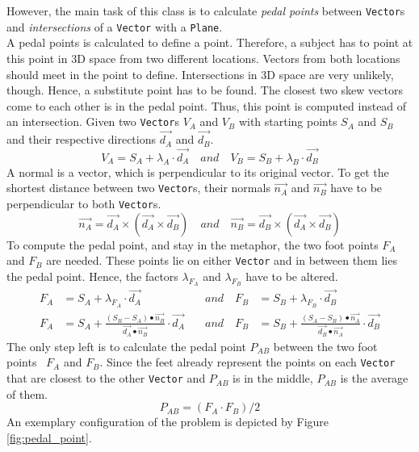 However, the main task of this class is to calculate \textit{pedal points} between \texttt{Vector}s and \textit{intersections} of a \texttt{Vector} with a \texttt{Plane}. 
\\
A pedal points is calculated to define a point. Therefore, a subject has to point at this point in \ac{3D} space from two different locations. Vectors  from both locations should meet in the point to define. Intersections in \ac{3D} space are very unlikely, though. Hence, a substitute point has to be found. The closest two skew vectors come to each other is in the pedal point. Thus, this point is computed instead of an intersection. Given two \texttt{Vector}s $V_{A}$ and $V_{B}$ with starting points $S_{A}$ and $S_{B}$ and their respective directions $\overrightarrow{d_{A}}$ and $\overrightarrow{d_{B}}$.
$$V_{A} = S_{A} + \lambda_{A} \cdot \overrightarrow{d_{A}} \quad and \quad V_{B} = S_{B} + \lambda_{B} \cdot \overrightarrow{d_{B}}$$
A normal is a vector, which is perpendicular to its original vector. To get the shortest distance between two \texttt{Vector}s, their normals $\overrightarrow{n_{A}}$ and $\overrightarrow{n_{B}}$ have to be perpendicular to both \texttt{Vector}s. 
$$\overrightarrow{n_{A}} = \overrightarrow{d_{A}} \times (\overrightarrow{d_{A}} \times \overrightarrow{d_{B}}) \quad and \quad \overrightarrow{n_{B}} = \overrightarrow{d_{B}} \times (\overrightarrow{d_{A}} \times \overrightarrow{d_{B}})$$
To compute the pedal point, and stay in the metaphor, the two foot points $F_{A}$ and $F_{B}$ are needed. These points lie on either \texttt{Vector} and in between them lies the pedal point. Hence, the factors $\lambda_{F_{A}}$ and $\lambda_{F_{B}}$ have to be altered.
\begin{align*}
	F_{A} &= S_{A} + \lambda_{F_{A}} \cdot \overrightarrow{d_{A}} \quad &and \quad F_{B} &= S_{B} + \lambda_{F_{B}} \cdot \overrightarrow{d_{B}} \\
	F_{A} &= S_{A} + \frac{(S_{B} - S_{A}) \bullet \overrightarrow{n_{B}}}{\overrightarrow{d_{A}} \bullet \overrightarrow{n_{B}}} \cdot \overrightarrow{d_{A}} \quad &and \quad F_{B} &= S_{B} + \frac{(S_{A} - S_{B}) \bullet \overrightarrow{n_{A}}}{\overrightarrow{d_{B}} \bullet \overrightarrow{n_{A}}} \cdot \overrightarrow{d_{B}} 
\end{align*}
The only step left is to calculate the pedal point $P_{AB}$ between the two foot points~\cite{PedalPoint} $F_{A}$ and $F_{B}$. Since the feet already represent the points on each \texttt{Vector} that are closest to the other \texttt{Vector} and $P_{AB}$ is in the middle, $P_{AB}$ is the average of them.
$$P_{AB} = (F_{A} \cdot F_{B}) / 2$$
An exemplary configuration of the problem is depicted by Figure \ref{fig:pedal_point}.

